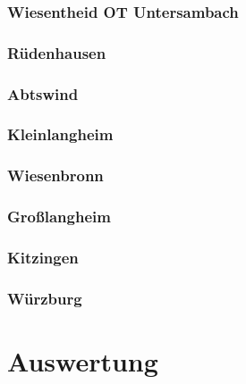 \documentclass[fontsize=12pt,a4paper]{scrreprt}
\begin{document}
\begin{landscape}
                \subsection{Wiesentheid OT Untersambach}
                
                
                \subsection{Rüdenhausen}
                
                
                \subsection{Abtswind}
                
                
                \subsection{Kleinlangheim}
                
                
                \subsection{Wiesenbronn}
                
                
                \subsection{Großlangheim}
                
                
                \subsection{Kitzingen}
                
                
                \subsection{Würzburg}
                
        \end{landscape}
    \chapter{Auswertung}
\end{document}
